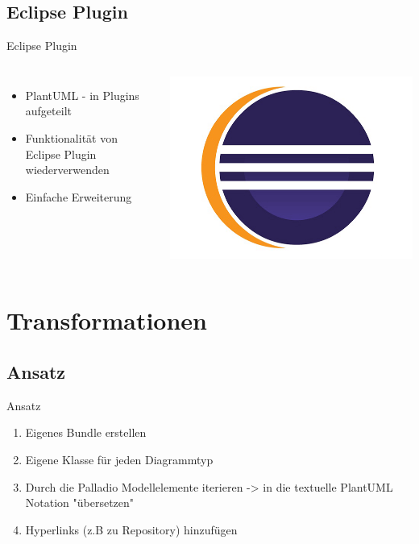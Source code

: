 \documentclass{sdqbeamer}
\begin{document}
\subsection{Eclipse Plugin}
\begin{frame}{Eclipse Plugin}
\begin{columns}
    \begin{itemize}
        \item PlantUML - in Plugins aufgeteilt
        \item Funktionalität von Eclipse Plugin wiederverwenden
        \item Einfache Erweiterung
    \end{itemize}
    
    \includegraphics[width=\textwidth]{eclipselogo.jpg}
\end{columns}
\end{frame}

\section{Transformationen}
\subsection{Ansatz}
\begin{frame}{Ansatz}
\begin{enumerate}
\item Eigenes Bundle erstellen
\item Eigene Klasse für jeden Diagrammtyp
\item Durch die Palladio Modellelemente iterieren -> in die textuelle PlantUML Notation "übersetzen"
\item Hyperlinks (z.B zu Repository) hinzufügen
\end{enumerate}
\end{frame}
\end{document}
